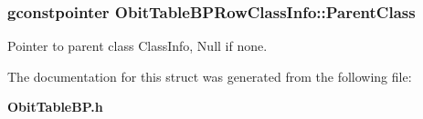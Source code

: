 \subsubsection{\setlength{\rightskip}{0pt plus 5cm}gconstpointer {\bf Obit\-Table\-BPRow\-Class\-Info::Parent\-Class}}\label{structObitTableBPRowClassInfo_o3}


Pointer to parent class Class\-Info, Null if none. 



The documentation for this struct was generated from the following file:\begin{CompactItemize}
\item 
{\bf Obit\-Table\-BP.h}\end{CompactItemize}

